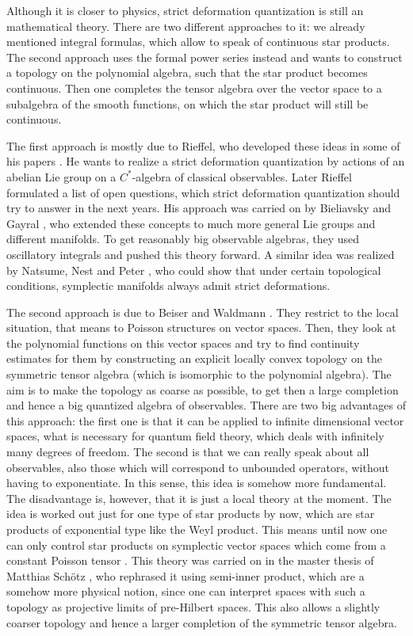 Although it is closer to physics, strict deformation quantization is still an 
mathematical theory. There are two different approaches to it: we 
already mentioned integral formulas, which allow to speak of continuous star 
products. The second approach uses the formal power series instead and wants to 
construct a topology on the polynomial algebra, such that the star product becomes 
continuous. Then one completes the tensor algebra over the vector space to a 
subalgebra of the smooth functions, on which the star product will still be 
continuous.


The first approach is mostly due to Rieffel, who developed these ideas in some of 
his papers \cite{rieffel:1989a, rieffel:1990c, rieffel:1993a}. He wants to 
realize a strict deformation quantization by actions of an abelian Lie group on a 
$C^*$-algebra of classical observables. Later Rieffel formulated a list of open 
questions, which strict deformation quantization should try to answer 
\cite{rieffel:1998a} in the next years. His approach was carried on by Bieliavsky 
and Gayral \cite{bieliavsky:2002a, bieliavsky.gayral:2015a}, who extended these 
concepts to much more general Lie groups and different manifolds. To get 
reasonably big observable algebras, they used oscillatory integrals and pushed 
this theory forward. A similar idea was realized by Natsume, Nest and 
Peter \cite{natsume.nest.peter:2003a}, who could show that under certain 
topological conditions, symplectic manifolds always admit strict deformations.


The second approach is due to Beiser and Waldmann 
\cite{beiser:2011a, beiser.waldmann:2014a, waldmann:2014a}. They restrict to the 
local situation, that means to Poisson structures on vector spaces. Then, they 
look at the polynomial functions on this vector spaces and try to find 
continuity estimates for them by constructing an explicit locally convex 
topology on the symmetric tensor algebra (which is isomorphic to the polynomial 
algebra). The aim is to make the topology as coarse as possible, to get then a 
large completion and hence a big quantized algebra of 
observables. There are two big advantages of this approach: the first one is 
that it can be applied to infinite dimensional vector spaces, what is necessary 
for quantum field theory, which deals with infinitely many degrees of freedom. 
The second is that we can really speak about all observables, also those 
which will correspond to unbounded operators, without having to exponentiate. In 
this sense, this idea is somehow more fundamental. The disadvantage is, however, 
that it is just a local theory at the moment. The idea is worked out just for 
one type of star products by now, which are star products of exponential type like 
the Weyl product. This means until now one can only control star products on 
symplectic vector spaces which come from a constant Poisson tensor 
\cite{waldmann:2014a}. This theory was carried on in the master thesis of Matthias 
Sch\"otz \cite{schoetz:2014a}, who rephrased it using semi-inner product, which 
are a somehow more physical notion, since one can interpret spaces with such a 
topology as projective limits of pre-Hilbert spaces. This also allows a slightly 
coarser topology and hence a larger completion of the symmetric tensor algebra.


